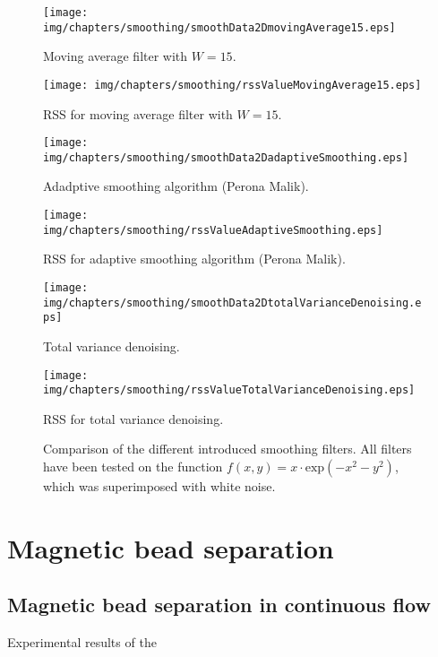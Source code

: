 \begin{figure}[htb]
  \begin{minipage}[t]{0.47\textwidth}
    \texttt{[image: img/chapters/smoothing/smoothData2DmovingAverage15.eps]}
    \caption{Moving average filter with $W=15$.}
  \end{minipage}
  \hfill
  \begin{minipage}[t]{0.47\textwidth}
    \texttt{[image: img/chapters/smoothing/rssValueMovingAverage15.eps]}
    \caption{RSS for moving average filter with $W=15$.}
  \end{minipage}

  \begin{minipage}[t]{0.47\textwidth}
    \texttt{[image: img/chapters/smoothing/smoothData2DadaptiveSmoothing.eps]}
    \caption{Adadptive smoothing algorithm (Perona Malik).}
  \end{minipage}
  \hfill
  \begin{minipage}[t]{0.47\textwidth}
    \texttt{[image: img/chapters/smoothing/rssValueAdaptiveSmoothing.eps]}
    \caption{RSS for adaptive smoothing algorithm (Perona Malik).}
  \end{minipage}
    
  \begin{minipage}[t]{0.47\textwidth}
    \texttt{[image: img/chapters/smoothing/smoothData2DtotalVarianceDenoising.eps]}
    \caption{Total variance denoising.}
  \end{minipage}
  \hfill
  \begin{minipage}[t]{0.47\textwidth}
    \texttt{[image: img/chapters/smoothing/rssValueTotalVarianceDenoising.eps]}
    \caption{RSS for total variance denoising.}
  \end{minipage}
  \caption[Comparison of different smoothing filters]{Comparison of the different introduced smoothing filters. All filters have been tested on the function $f(x,y) = x\cdot \text{exp}\left(-x^{2}-y^{2}\right)$, which was superimposed with white noise.}
  \label{fig:smoothingAlgorithmComparisonResult}
\end{figure}

\cleardoublepage

\chapter{Magnetic bead separation}\label{sec:magneticBeadSeparationAppendix}
\section{Magnetic bead separation in continuous flow}
Experimental results of the 

